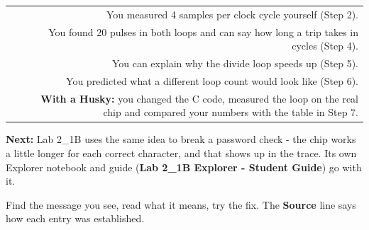 \documentclass[11pt,letterpaper]{article}
\begin{document}
\vspace{4pt}


{\small{}
\begin{longtable}{|R{0.0652}|R{0.9348}|}
\hline
{}\hdrcell{} &  \\ \hline
\endhead
[  ] & You measured 4 samples per clock cycle yourself (Step 2). \\ \hline
[  ] & You found 20 pulses in both loops and can say how long a trip takes in cycles (Step 4). \\ \hline
[  ] & You can explain why the divide loop speeds up (Step 5). \\ \hline
[  ] & You predicted what a different loop count would look like (Step 6). \\ \hline
[  ] & \textbf{With a Husky:} you changed the C code, measured the loop on the real chip and compared your numbers with the table in Step 7. \\ \hline
\end{longtable}}

\vspace{4pt}

\textbf{Next:} Lab 2\_1B uses the same idea to break a password check - the chip works a little longer for each
correct character, and that shows up in the trace. Its own Explorer notebook and guide (\textbf{Lab 2\_1B Explorer -
Student Guide}) go with it.

\clearpage


Find the message you see, read what it means, try the fix. The \textbf{Source} line says how each entry was
established.

\end{document}
